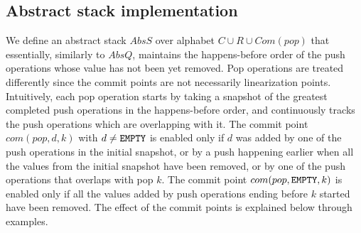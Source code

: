 \vspace{-3mm}
\subsection{Abstract stack implementation}
\vspace{-1mm}
We define an abstract stack $AbsS$ over alphabet $C\cup R\cup Com(pop)$ that essentially, similarly to $AbsQ$, maintains the happens-before order of the push operations whose value has not been yet removed. Pop operations are treated differently since the commit points are not necessarily linearization points. Intuitively, each pop operation starts by taking a snapshot of the greatest completed push operations in the happens-before order, and continuously tracks the push operations which are overlapping with it. The commit point $com(pop,d,k)$ with $d\neq {\tt EMPTY}$ is enabled only if $d$ was added by one of the push operations in the initial snapshot, or by a push happening earlier when all the values from the initial snapshot have been removed, or by one of the push operations that overlaps with pop $k$. The commit point $com(pop,{\tt EMPTY},k)$ is enabled only if all the values added by push operations ending before $k$ started have been removed. The effect of the commit points is explained below through examples.
\vspace{-.4mm}


